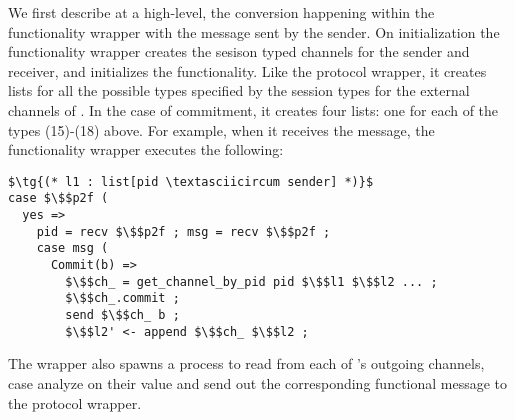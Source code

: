 We first describe at a high-level, the conversion happening within the functionality wrapper with the  message sent by the sender.
On initialization the functionality wrapper creates the sesison typed channels for the sender and receiver, and initializes the functionality.
Like the protocol wrapper, it creates lists for all the possible types specified by the session types for the external channels of \F. 
In the case of commitment, it creates four lists: one for each of the types (15)-(18) above.
For example, when it receives the  message, the functionality wrapper executes the following:
\begin{lstlisting}[basicstyle=\small\BeraMonottFamily, frame=single, mathescape]
$\tg{(* l1 : list[pid \textasciicircum sender] *)}$
case $\$$p2f (
  yes => 
    pid = recv $\$$p2f ; msg = recv $\$$p2f ;
    case msg (
      Commit(b) => 
        $\$$ch_ = get_channel_by_pid pid $\$$l1 $\$$l2 ... ;
        $\$$ch_.commit ;
        send $\$$ch_ b ;
        $\$$l2' <- append $\$$ch_ $\$$l2 ;
\end{lstlisting}
The wrapper also spawns a process to read from each of \Fcom's outgoing channels, case analyze on their value and send out the corresponding functional message to the protocol wrapper.

